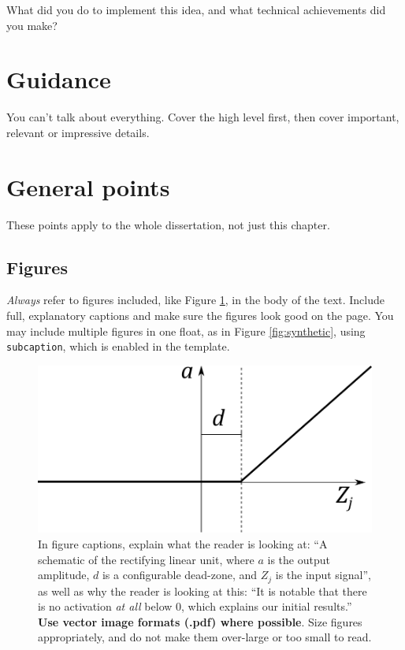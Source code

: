 \documentclass{l4proj}
\begin{document}
What did you do to implement this idea, and what technical achievements did you make?
\section{Guidance}
You can't talk about everything. Cover the high level first, then cover important, relevant or impressive details.



\section{General points}

These points apply to the whole dissertation, not just this chapter.



\subsection{Figures}
\emph{Always} refer to figures included, like Figure \ref{fig:relu}, in the body of the text. Include full, explanatory captions and make sure the figures look good on the page.
You may include multiple figures in one float, as in Figure \ref{fig:synthetic}, using \texttt{subcaption}, which is enabled in the template.



\begin{figure}
    \centering
    \includegraphics[width=0.5\linewidth]{images/relu.pdf}    

    \caption{In figure captions, explain what the reader is looking at: ``A schematic of the rectifying linear unit, where $a$ is the output amplitude,
    $d$ is a configurable dead-zone, and $Z_j$ is the input signal'', as well as why the reader is looking at this: 
    ``It is notable that there is no activation \emph{at all} below 0, which explains our initial results.'' 
    \textbf{Use vector image formats (.pdf) where possible}. Size figures appropriately, and do not make them over-large or too small to read.
    }

    \label{fig:relu} 
\end{figure}
\end{document}
